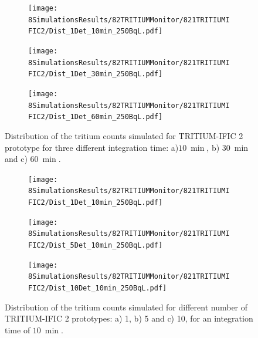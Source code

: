\begin{figure}
\centering
    \begin{subfigure}[b]{0.6\textwidth}
    \centering
    \texttt{[image: 8SimulationsResults/82TRITIUMMonitor/821TRITIUMIFIC2/Dist\_1Det\_10min\_250BqL.pdf]}  
    \caption{\label{subfig:1Det10min250BqLST}}
    \end{subfigure}
    \hfill
    \begin{subfigure}[b]{0.6\textwidth}
    \centering
    \texttt{[image: 8SimulationsResults/82TRITIUMMonitor/821TRITIUMIFIC2/Dist\_1Det\_30min\_250BqL.pdf]}  
    \caption{\label{subfig:1Det30min250BqLST}}
    \end{subfigure}
    \hfill
    \begin{subfigure}[b]{0.6\textwidth}
    \centering
    \texttt{[image: 8SimulationsResults/82TRITIUMMonitor/821TRITIUMIFIC2/Dist\_1Det\_60min\_250BqL.pdf]}  
    \caption{\label{subfig:1Det60min250BqLST}}
    \end{subfigure}
 \caption{Distribution of the tritium counts simulated for TRITIUM-IFIC 2 prototype for three different integration time: a)$10~\min$, b) $30~\min$ and c) $60~\min$.}
 \label{fig:1Det250BqLseveralTimes}
\end{figure} 

\begin{figure}
\centering
    \begin{subfigure}[b]{0.6\textwidth}
    \centering
    \texttt{[image: 8SimulationsResults/82TRITIUMMonitor/821TRITIUMIFIC2/Dist\_1Det\_10min\_250BqL.pdf]}  
    \caption{\label{subfig:1Det10min250BqLSD}}
    \end{subfigure}
    \hfill
    \begin{subfigure}[b]{0.6\textwidth}
    \centering
    \texttt{[image: 8SimulationsResults/82TRITIUMMonitor/821TRITIUMIFIC2/Dist\_5Det\_10min\_250BqL.pdf]}  
    \caption{\label{subfig:5Det10min250BqLSD}}
    \end{subfigure}
    \hfill
    \begin{subfigure}[b]{0.6\textwidth}
    \centering
    \texttt{[image: 8SimulationsResults/82TRITIUMMonitor/821TRITIUMIFIC2/Dist\_10Det\_10min\_250BqL.pdf]}  
    \caption{\label{subfig:10Det10min250BqLSD}}
    \end{subfigure}
 \caption{Distribution of the tritium counts simulated for different number of TRITIUM-IFIC 2 prototypes: a) 1, b) 5 and c) 10, for an integration time of $10~\min$.}
 \label{fig:SeveralDet250BqL10min}
\end{figure}

